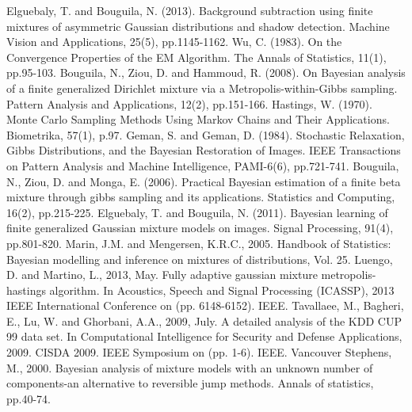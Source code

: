 \documentclass[conference]{IEEEtran}
\begin{document}
\begin{thebibliography}{00}
 Elguebaly, T. and Bouguila, N. (2013). Background subtraction using finite mixtures of asymmetric Gaussian distributions and shadow detection. Machine Vision and Applications, 25(5), pp.1145-1162.
 Wu, C. (1983). On the Convergence Properties of the EM Algorithm. The Annals of Statistics, 11(1), pp.95-103.
 Bouguila, N., Ziou, D. and Hammoud, R. (2008). On Bayesian analysis of a finite generalized Dirichlet mixture via a Metropolis-within-Gibbs sampling. Pattern Analysis and Applications, 12(2), pp.151-166.
 Hastings, W. (1970). Monte Carlo Sampling Methods Using Markov Chains and Their Applications. Biometrika, 57(1), p.97.
Geman, S. and Geman, D. (1984). Stochastic Relaxation, Gibbs Distributions, and the Bayesian Restoration of Images. IEEE Transactions on Pattern Analysis and Machine Intelligence, PAMI-6(6), pp.721-741.
 Bouguila, N., Ziou, D. and Monga, E. (2006). Practical Bayesian estimation of a finite beta mixture through gibbs sampling and its applications. Statistics and Computing, 16(2), pp.215-225.
 Elguebaly, T. and Bouguila, N. (2011). Bayesian learning of finite generalized Gaussian mixture models on images. Signal Processing, 91(4), pp.801-820.
 Marin, J.M. and Mengersen, K.R.C., 2005. Handbook of Statistics: Bayesian modelling and inference on mixtures of distributions, Vol. 25.
 Luengo, D. and Martino, L., 2013, May. Fully adaptive gaussian mixture metropolis-hastings algorithm. In Acoustics, Speech and Signal Processing (ICASSP), 2013 IEEE International Conference on (pp. 6148-6152). IEEE.
 Tavallaee, M., Bagheri, E., Lu, W. and Ghorbani, A.A., 2009, July. A detailed analysis of the KDD CUP 99 data set. In Computational Intelligence for Security and Defense Applications, 2009. CISDA 2009. IEEE Symposium on (pp. 1-6). IEEE.
Vancouver	
 Stephens, M., 2000. Bayesian analysis of mixture models with an unknown number of components-an alternative to reversible jump methods. Annals of statistics, pp.40-74.
\end{thebibliography}
\end{document}
